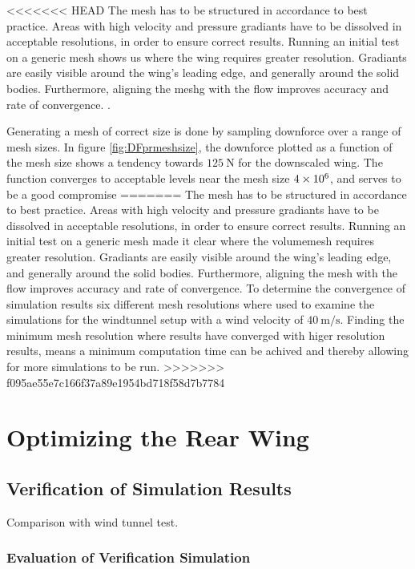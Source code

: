 <<<<<<< HEAD
  The mesh has to be structured in accordance to best practice. Areas with high velocity and pressure gradiants have to be dissolved in acceptable resolutions, in order to ensure correct results. Running an initial test on a generic mesh shows us where the wing requires greater resolution. Gradiants are easily visible around the wing's leading edge, and generally around the solid bodies. Furthermore, aligning the meshg with the flow improves accuracy and rate of convergence.
  .

  Generating a mesh of correct size is done by sampling downforce over a range of mesh sizes. In figure \ref{fig:DFprmeshsize}, the downforce plotted as a function of the mesh size shows a tendency towards $\SI{125}{\newton}$ for the downscaled wing. The function converges to acceptable levels near the mesh size $\SI{4E6}{}$, and serves to be a good compromise
=======
The mesh has to be structured in accordance to best practice. Areas with high velocity and pressure gradiants have to be dissolved in acceptable resolutions, in order to ensure correct results. Running an initial test on a generic mesh made it clear where the volumemesh requires greater resolution. Gradiants are easily visible around the wing's leading edge, and generally around the solid bodies. Furthermore, aligning the mesh with the flow improves accuracy and rate of convergence. To determine the convergence of simulation results six different mesh resolutions where used to examine the simulations for the windtunnel setup with a wind velocity of $\SI{40}{\metre\per\second}$. Finding the minimum mesh resolution where results have converged with higer resolution results, means a minimum computation time can be achived and thereby allowing for more simulations to be run.
>>>>>>> f095ae55e7c166f37a89e1954bd718f58d7b7784

\section{Optimizing the Rear Wing}


  \subsection{Verification of Simulation Results}
  \label{sec:simulationcomparison}

  Comparison with wind tunnel test.

  \subsubsection{Evaluation of Verification Simulation}


